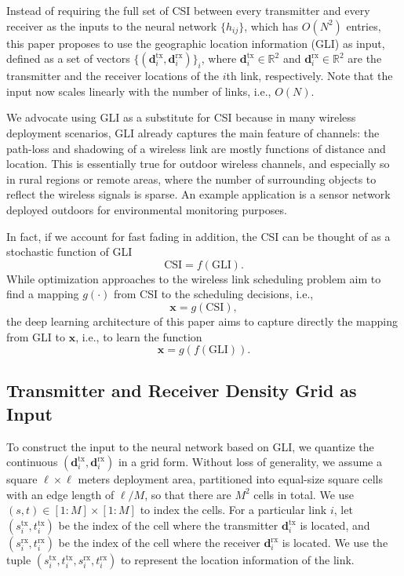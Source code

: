 \documentclass[journal,12pt,onecolumn,draftclsnofoot,]{IEEEtran}
\begin{document}
Instead of requiring the full set of CSI between every
transmitter and every receiver as the inputs to the neural network $\{h_{ij}\}$,
which has $O(N^2)$ entries, this paper proposes to use the geographic location information (GLI) as input,
defined as a set of vectors $\{(\mathbf d^{\text{tx}}_{i},\mathbf
d^{\text{rx}}_{i})\}_i$, where $\mathbf d^{\text{tx}}_{i}\in\mathbb R^2$ and
$\mathbf d^{\text{rx}}_{i}\in\mathbb R^2$ are the transmitter and the receiver
locations of the $i$th link, respectively. Note that the input now
scales linearly with the number of links, i.e., $O(N)$.

We advocate using GLI as a substitute for CSI because in many wireless
deployment scenarios, GLI already captures the main feature of channels: the
path-loss and shadowing of a wireless link are mostly functions of distance and
location. This is essentially true for outdoor wireless channels, and
especially so in rural regions or remote areas, where the number of
surrounding objects to reflect the wireless signals is sparse. An example
application is a sensor network deployed outdoors for environmental monitoring
purposes.   

In fact, if we account for fast fading in addition, the CSI can be thought of
as a stochastic function of GLI 
\begin{equation}
\text{CSI} = f(\text{GLI}).
\end{equation}
While optimization approaches to the wireless link scheduling problem aim to
find a mapping $g(\cdot)$ from CSI to the scheduling decisions, i.e.,
\begin{equation}
\mathbf x = g(\text{CSI}),
\end{equation}
the deep learning architecture of this paper aims to capture directly the
mapping from GLI to $\mathbf x$, i.e., to learn the function
\begin{equation}
\mathbf x = g(f(\text{GLI})).
\end{equation}

\subsection{Transmitter and Receiver Density Grid as Input}

To construct the input to the neural network based on GLI, we quantize the continuous
$(\mathbf d^{\text{tx}}_{i}, \mathbf d^{\text{rx}}_{i})$ in a grid form.
Without loss of generality, we assume a square $\ell \times \ell$ meters deployment area, partitioned
into equal-size square cells with an edge length of $\ell/M$, so that
there are $M^2$ cells in total. We use $(s,t)\in[1:M]\times[1:M]$ to index the
cells. For a particular link $i$, let $(s^\text{tx}_i,t^\text{tx}_i)$ be the
index of the cell where the transmitter $\mathbf d^\text{tx}_i$ is located, and
$(s^\text{rx}_i,t^\text{rx}_i)$ be the index of the cell where the receiver
$\mathbf d^\text{rx}_i$ is located.  We use the tuple
$(s^\text{tx}_i,t^\text{tx}_i,s^\text{rx}_i,t^\text{rx}_i)$ to represent the
location information of the link.
\end{document}
